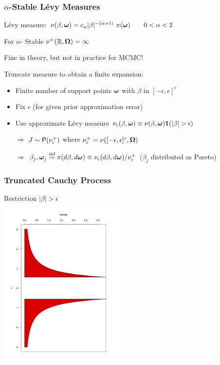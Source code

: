 \documentclass[]{beamer}
\newcommand{\bs}[2]{\begin{frame} \frametitle{#1}
{#2}
\end{frame} }
\begin{document}
\bs{$\alpha$-Stable L\'evy Measures} {

L\'evy measure: $\nu(\beta, \bm \omega) =  c_\alpha |\beta|^{-(\alpha
    +1)}\ \pi(\bm \omega) \qquad 0 < \alpha < 2$ \pause

For $\alpha$- Stable $\nu^+(\mathbb{R}, \bm \Omega) = \infty$ \pause

Fine in theory, but not in practice for MCMC! \pause

\vspace{14pt}
Truncate measure to obtain a finite expansion:
\begin{itemize}
 \item Finite number of support points $\bm \omega$ with $\beta$ in
   $[-\epsilon, \epsilon]^c$  \pause
\item Fix $\epsilon$  (for given prior approximation error) \pause
\item Use approximate L\'evy  measure
$\nu_{\epsilon}(\beta, \bm \omega) \equiv \nu(\beta,
\bm \omega){\bm 1}(|\beta| > \epsilon) $ \pause
\item[$\Rightarrow$] $J \sim \mbox{\sf P}(\nu_{\epsilon}^+)$ where
  $\nu^+_{\epsilon} = \nu([-\epsilon, \epsilon]^c, \bm \Omega)$ \pause
\item[$\Rightarrow$]  $\beta_j, \bm \omega_j \mathrel{\mathop{\sim}\limits^{\mathit{iid}}} \pi(d\beta, d\bm \omega) \equiv
  \nu_\epsilon(d\beta , d \bm \omega)/\nu^+_{\epsilon}$ ($\beta_j$
  distributed as Pareto)

\end{itemize}
}


\bs{Truncated Cauchy Process} {
\centerline{Restriction  $|\beta| > \epsilon$}

\centerline{\includegraphics[width=2.5in,angle=90]{cauchy1}}
}
\end{document}
